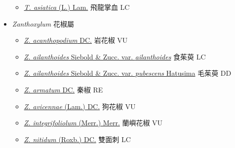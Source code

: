 \begin{itemize}
  \begin{itemize}
        \item[] \href{http://www.theplantlist.org/tpl1.1/search?q=Toddalia+asiatica}{\textit{T. asiatica} (L.) Lam.}   飛龍掌血   LC
  \end{itemize}
 \item[] \textit{Zanthoxylum} 花椒屬
                                
  \begin{itemize}
        \item[] \href{http://www.theplantlist.org/tpl1.1/search?q=Zanthoxylum+acanthopodium}{\textit{Z. acanthopodium} DC.}   岩花椒   VU
        \item[] \href{http://www.theplantlist.org/tpl1.1/search?q=Zanthoxylum+ailanthoides+var.+ailanthoides}{\textit{Z. ailanthoides} Siebold \& Zucc. var. \textit{ailanthoides}}   食茱萸   LC
        \item[] \href{http://www.theplantlist.org/tpl1.1/search?q=Zanthoxylum+ailanthoides+var.+pubescens}{\textit{Z. ailanthoides} Siebold \& Zucc. var. \textit{pubescens} Hatusima}   毛茱萸   DD
        \item[] \href{http://www.theplantlist.org/tpl1.1/search?q=Zanthoxylum+armatum}{\textit{Z. armatum} DC.}   秦椒   RE
        \item[] \href{http://www.theplantlist.org/tpl1.1/search?q=Zanthoxylum+avicennae}{\textit{Z. avicennae} (Lam.) DC.}   狗花椒   VU
        \item[] \href{http://www.theplantlist.org/tpl1.1/search?q=Zanthoxylum+integrifoliolum}{\textit{Z. integrifoliolum} (Merr.) Merr.}   蘭嶼花椒   VU
        \item[] \href{http://www.theplantlist.org/tpl1.1/search?q=Zanthoxylum+nitidum}{\textit{Z. nitidum} (Roxb.) DC.}   雙面刺   LC

\end{itemize}
\end{itemize}
